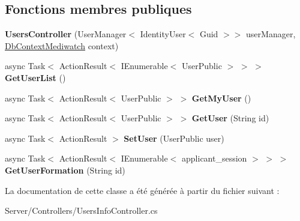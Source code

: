 \subsection*{Fonctions membres publiques}
\begin{DoxyCompactItemize}
\item 
\mbox{\label{class_mediwatch_1_1_server_1_1_controllers_1_1_users_controller_a7957039d9c7d38f0e6791f04e0dcde1e}} 
{\bfseries Users\+Controller} (User\+Manager$<$ Identity\+User$<$ Guid $>$$>$ user\+Manager, \hyperlink{class_server_1_1_db_context_mediwatch}{Db\+Context\+Mediwatch} context)
\item 
\mbox{\label{class_mediwatch_1_1_server_1_1_controllers_1_1_users_controller_a5b525adc63d36869bde5021b82480228}} 
async Task$<$ Action\+Result$<$ I\+Enumerable$<$ User\+Public $>$ $>$ $>$ {\bfseries Get\+User\+List} ()
\item 
\mbox{\label{class_mediwatch_1_1_server_1_1_controllers_1_1_users_controller_a9a705b16c851ce5bb20f426b6e923799}} 
async Task$<$ Action\+Result$<$ User\+Public $>$ $>$ {\bfseries Get\+My\+User} ()
\item 
\mbox{\label{class_mediwatch_1_1_server_1_1_controllers_1_1_users_controller_a27103389ca1c6c33d21a3dc3212d7b08}} 
async Task$<$ Action\+Result$<$ User\+Public $>$ $>$ {\bfseries Get\+User} (String id)
\item 
\mbox{\label{class_mediwatch_1_1_server_1_1_controllers_1_1_users_controller_a414ca2854bf71701319b3c34dbda03ab}} 
async Task$<$ Action\+Result $>$ {\bfseries Set\+User} (User\+Public user)
\item 
\mbox{\label{class_mediwatch_1_1_server_1_1_controllers_1_1_users_controller_a3da0476c39418727064b44af9e007010}} 
async Task$<$ Action\+Result$<$ I\+Enumerable$<$ applicant\+\_\+session $>$ $>$ $>$ {\bfseries Get\+User\+Formation} (String id)
\end{DoxyCompactItemize}


La documentation de cette classe a été générée à partir du fichier suivant \+:\begin{DoxyCompactItemize}
\item 
Server/\+Controllers/Users\+Info\+Controller.\+cs\end{DoxyCompactItemize}
